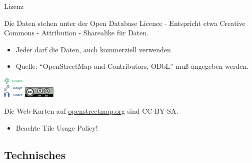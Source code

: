 \documentclass{beamer}
\begin{document}
\begin{frame}{Lizenz}

Die Daten stehen unter der Open Database Licence - Entspricht etwa Creative Commons - Attribution - Sharealike für Daten.
\begin{itemize}
  \item Jeder darf die Daten, auch kommerziell verwenden
  \item Quelle: "`OpenStreetMap and Contributors, ODbL"' muß angegeben werden.
\end{itemize}

 \begin{center}
 \includegraphics[width=1cm]{ODbL.png}
 \hspace{2cm}
 \includegraphics[width=1.5cm]{cc-by-sa.pdf}
 \end{center}

\pause
Die Web-Karten auf \href{http://osm.org}{openstreetmap.org} sind CC-BY-SA.
\begin{itemize}
  \item Beachte Tile Usage Policy!
\end{itemize}

\end{frame}

\subsection{Technisches}
\end{document}
